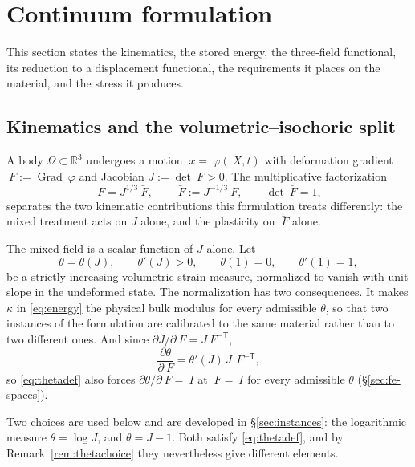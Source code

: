\documentclass[11pt]{article}
\newcommand{\F}{~F}
\newcommand{\Id}{~I}
\newcommand{\disp}{~\varphi}
\newcommand{\bx}{~x}
\newcommand{\bX}{~X}
\newcommand{\Reals}{\mathbb{R}}
\newcommand{\Grad}{\operatorname{Grad}}
\theoremstyle{definition}
\theoremstyle{plain}
\begin{document}
\section{Continuum formulation}
\label{sec:continuum}

This section states the kinematics, the stored energy, the three-field
functional, its reduction to a displacement functional, the requirements it
places on the material, and the stress it produces.

\subsection{Kinematics and the volumetric--isochoric split}
\label{sec:kinematics}

A body $\Omega \subset \Reals^3$ undergoes a motion $\bx = \disp(\bX, t)$ with
deformation gradient $\F := \Grad\disp$ and Jacobian $J := \det\F > 0$. The
multiplicative factorization
\begin{equation}
  \label{eq:isosplit}
  \F = J^{1/3}\bar{\F},
  \qquad
  \bar{\F} := J^{-1/3}\F,
  \qquad
  \det\bar{\F} = 1,
\end{equation}
separates the two kinematic contributions this formulation treats differently:
the mixed treatment acts on $J$ alone, and the plasticity on $\bar{\F}$ alone.

The mixed field is a scalar function of $J$ alone. Let
\begin{equation}
  \label{eq:thetadef}
  \theta = \theta(J),
  \qquad \theta'(J) > 0,
  \qquad \theta(1) = 0,
  \qquad \theta'(1) = 1,
\end{equation}
be a strictly increasing volumetric strain measure, normalized to vanish with
unit slope in the undeformed state. The normalization has two consequences. It
makes $\kappa$ in \eqref{eq:energy} the physical bulk modulus for every
admissible $\theta$, so that two instances of the formulation are calibrated to
the same material rather than to two different ones. And since
$\partial J/\partial\F = J\F^{-\mathsf T}$,
\begin{equation}
  \label{eq:dtheta}
  \frac{\partial\theta}{\partial\F} = \theta'(J)\, J\, \F^{-\mathsf T},
\end{equation}
so \eqref{eq:thetadef} also forces $\partial\theta/\partial\F = \Id$ at
$\F = \Id$ for every admissible $\theta$ (\S\ref{sec:fe-spaces}).

Two choices are used below and are developed in \S\ref{sec:instances}: the
logarithmic measure $\theta = \log J$, and $\theta = J - 1$. Both satisfy
\eqref{eq:thetadef}, and by Remark~\ref{rem:thetachoice} they nevertheless give
different elements.
\end{document}
